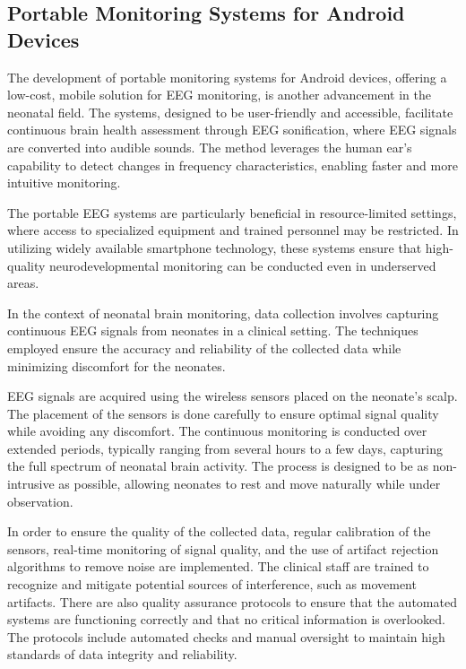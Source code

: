 \documentclass[12pt,journal,compsoc]{IEEEtran}
\begin{document}
\subsection{Portable Monitoring Systems for Android Devices}

The development of portable monitoring systems for Android devices, offering a low-cost, mobile solution for EEG monitoring, is another advancement in the neonatal field. The systems, designed to be user-friendly and accessible, facilitate continuous brain health assessment through EEG sonification, where EEG signals are converted into audible sounds. The method leverages the human ear's capability to detect changes in frequency characteristics, enabling faster and more intuitive monitoring.

The portable EEG systems are particularly beneficial in resource-limited settings, where access to specialized equipment and trained personnel may be restricted. In utilizing widely available smartphone technology, these systems ensure that high-quality neurodevelopmental monitoring can be conducted even in underserved areas.  

In the context of neonatal brain monitoring, data collection involves capturing continuous EEG signals from neonates in a clinical setting. The techniques employed ensure the accuracy and reliability of the collected data while minimizing discomfort for the neonates.

EEG signals are acquired using the wireless sensors placed on the neonate’s scalp. The placement of the sensors is done carefully to ensure optimal signal quality while avoiding any discomfort. The continuous monitoring is conducted over extended periods, typically ranging from several hours to a few days, capturing the full spectrum of neonatal brain activity. The process is designed to be as non-intrusive as possible, allowing neonates to rest and move naturally while under observation.  

In order to ensure the quality of the collected data, regular calibration of the sensors, real-time monitoring of signal quality, and the use of artifact rejection algorithms to remove noise are implemented. The clinical staff are trained to recognize and mitigate potential sources of interference, such as movement artifacts. There are also quality assurance protocols to ensure that the automated systems are functioning correctly and that no critical information is overlooked. The protocols include automated checks and manual oversight to maintain high standards of data integrity and reliability. 
\end{document}
